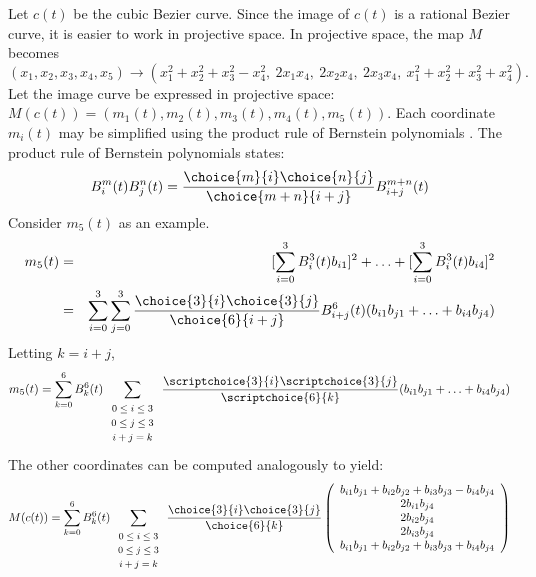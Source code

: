 \documentclass[12pt]{article}
\begin{document}
\prf
Let $c(t)$ be the cubic Bezier curve.
Since the image of $c(t)$ is a rational Bezier curve, it is easier 
to work in projective space.
In projective space, the map $M$ becomes
\[
	 (x_1,x_2,x_3,x_4,x_5) \rightarrow
	 (x_1^2 + x_2^2 + x_3^2 - x_4^2,\ 
	 2x_1 x_4,\ 2x_2 x_4,\ 2x_3 x_4,\ 
	 x_1^2 + x_2^2 + x_3^2 + x_4^2).
\]
Let the image curve be expressed in projective space: 
$M(c(t)) = (m_1(t),m_2(t),m_3(t),m_4(t),m_5(t))$.
Each coordinate $m_i(t)$ may be simplified using the product rule 
of Bernstein polynomials \cite{farin02}.
The product rule of Bernstein polynomials \cite{farin02} states:
\[
B_i^m(t) B_j^n(t) = \frac{\choice{m}{i} \choice{n}{j}}{\choice{m+n}{i+j}} B_{i+j}^{m+n}(t)
\]
Consider $m_5(t)$ as an example.
\begin{eqnarray}
m_5(t) & = & [\sum_{i=0}^3 B_i^3(t) b_{i1}]^2 + 
	\ldots + [\sum_{i=0}^3 B_i^3(t) b_{i4}]^2 \nonumber \\
     & = &  \sum_{i=0}^3 \sum_{j=0}^3 
	\frac{\choice{3}{i} \choice{3}{j}}{\choice{6}{i+j}}
       B^6_{i+j}(t) (b_{i1} b_{j1} + \ldots + b_{i4} b_{j4}) \nonumber
\end{eqnarray}
Letting $k=i+j$, 
\[ m_5(t) = \sum_{k=0}^6 B_k^6(t) 
	\sum_{\begin{array}{c}  \mbox{\footnotesize{$0 \leq i \leq 3$}} \\ 
			     \mbox{\footnotesize{$0 \leq j \leq 3$}} \\ 
			     \mbox{\footnotesize{$i+j=k$}}
			     \end{array}} 
	\frac{\scriptchoice{3}{i} \scriptchoice{3}{j}}{\scriptchoice{6}{k}}
	(b_{i1} b_{j1} + \ldots + b_{i4} b_{j4}) \]
The other coordinates can be computed analogously to yield:
\[ M(c(t)) = 
   \sum_{k=0}^6 B_k^6(t)
	\sum_{\begin{array}{c}  \mbox{\footnotesize{$0 \leq i \leq 3$}} \\ 
			     \mbox{\footnotesize{$0 \leq j \leq 3$}} \\ 
			     \mbox{\footnotesize{$i+j=k$}}
			     \end{array}} 
	\frac{\choice{3}{i} \choice{3}{j}}{\choice{6}{k}}
	\left( \begin{array}{c}
            b_{i1} b_{j1} + b_{i2} b_{j2} + b_{i3} b_{j3} - b_{i4} b_{j4} \\
            2b_{i1} b_{j4} \\
            2b_{i2} b_{j4} \\
            2b_{i3} b_{j4} \\
            b_{i1} b_{j1} + b_{i2} b_{j2} + b_{i3} b_{j3} + b_{i4} b_{j4}
	\end{array} \right) \]
\end{document}
